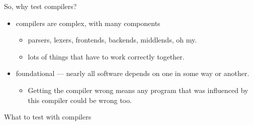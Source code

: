 \documentclass{beamer}
\begin{document}
\begin{frame}
  So, why test compilers?

  \begin{itemize}
  \item compilers are complex, with many components
          \begin{itemize}
          \item parsers, lexers, frontends, backends, middlends, oh my.
          \item lots of things that have to work correctly together.
          \end{itemize}
  \item foundational --- nearly all software depends on one in some
    way or another.
    \begin{itemize}
    \item Getting the compiler wrong means any program that was
      influenced by this compiler could be wrong too.
    \end{itemize}
  \end{itemize}
\end{frame}

\begin{frame}
  What to test with compilers

  
\end{frame}
\end{document}
